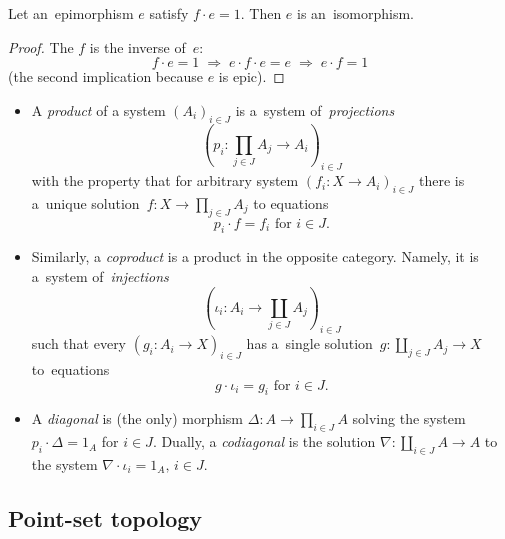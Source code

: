\begin{lem} \label{lem:epi->iso}
  Let an~epimorphism $e$ satisfy $f \cdot e = 1$.
  Then $e$ is an~isomorphism.
\end{lem}
\begin{proof}
  The $f$ is the inverse of~$e$:
  \[
    f \cdot e = 1 \; \Rightarrow \; e \cdot f \cdot e = e \; \Rightarrow \; e
    \cdot f = 1
  \]
  (the second implication because $e$ is epic).
\end{proof}

\begin{itemize}
\item A \emph{product} of a system $\left(A_i\right)_{i\in J}$ is a~system
of~\emph{projections\/}
\[
  \left(p_i\colon \prod_{j\in J} A_j \to A_i \right)_{i\in J}
\]
with the property that for arbitrary system $\left(f_i\colon X \to
A_i\right)_{i\in J}$ there is a~unique solution~$f\colon X \to \prod_{j\in
J} A_j$ to equations
\[
  p_i \cdot f = f_i \text{ for } i\in J.
\]

\item Similarly, a \emph{coproduct} is a product in the opposite category.
Namely, it is a~system of~\emph{injections\/}
\[
  \left(\iota_i\colon A_i \to \coprod_{j\in J} A_j \right)_{i\in J}
\]
such that every $\left(g_i\colon A_i \to X \right)_{i\in J}$ has a~single
solution~$g\colon \coprod_{j\in J} A_j \to X$ to~equations
\[
  g \cdot \iota_i = g_i \text{ for } i\in J.
\]

\item A \emph{diagonal} is (the only) morphism $\Delta\colon A \to \prod_{i\in
J} A$ solving the system $p_i\cdot \Delta = 1_A$ for $i \in J$.
Dually, a \emph{codiagonal} is the solution $\nabla\colon \coprod_{i\in J} A
\to A$ to the system $\nabla\cdot \iota_i = 1_A, \, i \in J$.
\end{itemize}


\subsection*{Point-set topology}

